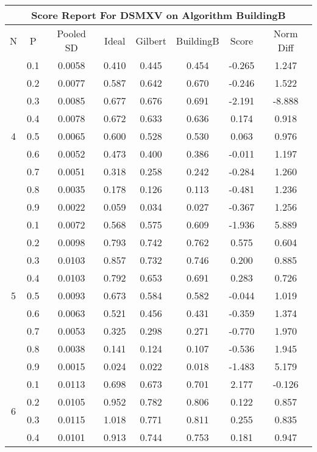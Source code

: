 \documentclass[11pt,a4paper]{report}
\begin{document}
\begin{longtable}{ | c | c || c | c | c | c | c | c | }
\hline
\multicolumn{8}{|c|}{ Score Report For DSMXV on Algorithm BuildingB} \\
\hline
N & P & Pooled SD &  Ideal &  Gilbert & BuildingB  & Score & Norm Diff \\
 \hline
 \hline
 \endhead
\multirow{9}{*}{4} & 0.1 & 0.0058 & 0.410 & 0.445 & 0.454 & -0.265 & 1.247 \\
 & 0.2 & 0.0077 & 0.587 & 0.642 & 0.670 & -0.246 & 1.522 \\
 & 0.3 & 0.0085 & 0.677 & 0.676 & 0.691 & -2.191 & -8.888 \\
 & 0.4 & 0.0078 & 0.672 & 0.633 & 0.636 & 0.174 & 0.918 \\
 & 0.5 & 0.0065 & 0.600 & 0.528 & 0.530 & 0.063 & 0.976 \\
 & 0.6 & 0.0052 & 0.473 & 0.400 & 0.386 & -0.011 & 1.197 \\
 & 0.7 & 0.0051 & 0.318 & 0.258 & 0.242 & -0.284 & 1.260 \\
 & 0.8 & 0.0035 & 0.178 & 0.126 & 0.113 & -0.481 & 1.236 \\
 & 0.9 & 0.0022 & 0.059 & 0.034 & 0.027 & -0.367 & 1.256 \\
 \hline
\multirow{9}{*}{5} & 0.1 & 0.0072 & 0.568 & 0.575 & 0.609 & -1.936 & 5.889 \\
 & 0.2 & 0.0098 & 0.793 & 0.742 & 0.762 & 0.575 & 0.604 \\
 & 0.3 & 0.0103 & 0.857 & 0.732 & 0.746 & 0.200 & 0.885 \\
 & 0.4 & 0.0103 & 0.792 & 0.653 & 0.691 & 0.283 & 0.726 \\
 & 0.5 & 0.0093 & 0.673 & 0.584 & 0.582 & -0.044 & 1.019 \\
 & 0.6 & 0.0063 & 0.521 & 0.456 & 0.431 & -0.359 & 1.374 \\
 & 0.7 & 0.0053 & 0.325 & 0.298 & 0.271 & -0.770 & 1.970 \\
 & 0.8 & 0.0038 & 0.141 & 0.124 & 0.107 & -0.536 & 1.945 \\
 & 0.9 & 0.0015 & 0.024 & 0.022 & 0.018 & -1.483 & 5.179 \\
 \hline
\multirow{9}{*}{6} & 0.1 & 0.0113 & 0.698 & 0.673 & 0.701 & 2.177 & -0.126 \\
 & 0.2 & 0.0105 & 0.952 & 0.782 & 0.806 & 0.122 & 0.857 \\
 & 0.3 & 0.0115 & 1.018 & 0.771 & 0.811 & 0.255 & 0.835 \\
 & 0.4 & 0.0101 & 0.913 & 0.744 & 0.753 & 0.181 & 0.947 \\

\end{longtable}
\end{document}

